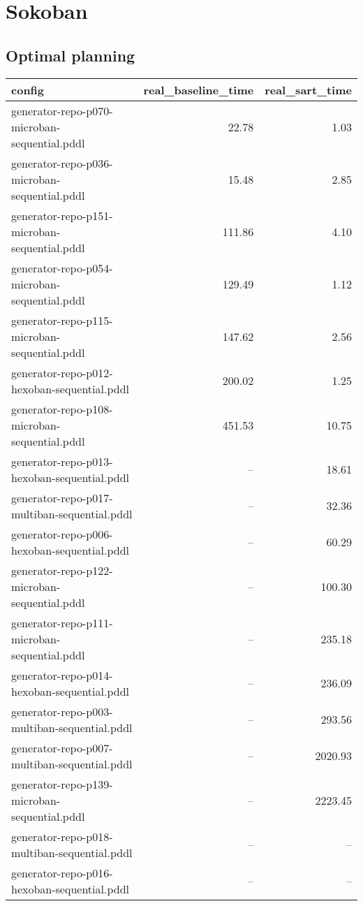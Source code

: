 \documentclass{article}
\begin{document}
                \newpage \section{Sokoban}
                    \subsection*{Optimal planning}
                    
                            \begin{center}
                            \scriptsize
                            \begin{tabular}{@{}l|r|r@{}}
                            config & real\_baseline\_time & real\_sart\_time\\\midrule
                             generator-repo-p070-microban-sequential.pddl&22.78&1.03\\
 generator-repo-p036-microban-sequential.pddl&15.48&2.85\\
 generator-repo-p151-microban-sequential.pddl&111.86&4.10\\
 generator-repo-p054-microban-sequential.pddl&129.49&1.12\\
 generator-repo-p115-microban-sequential.pddl&147.62&2.56\\
 generator-repo-p012-hexoban-sequential.pddl&200.02&1.25\\
 generator-repo-p108-microban-sequential.pddl&451.53&10.75\\
 generator-repo-p013-hexoban-sequential.pddl&--&18.61\\
 generator-repo-p017-multiban-sequential.pddl&--&32.36\\
 generator-repo-p006-hexoban-sequential.pddl&--&60.29\\
 generator-repo-p122-microban-sequential.pddl&--&100.30\\
 generator-repo-p111-microban-sequential.pddl&--&235.18\\
 generator-repo-p014-hexoban-sequential.pddl&--&236.09\\
 generator-repo-p003-multiban-sequential.pddl&--&293.56\\
 generator-repo-p007-multiban-sequential.pddl&--&2020.93\\
 generator-repo-p139-microban-sequential.pddl&--&2223.45\\
 generator-repo-p018-multiban-sequential.pddl&--&--\\
 generator-repo-p016-hexoban-sequential.pddl&--&--\\

\end{tabular}
\end{center}
\end{document}
